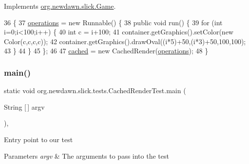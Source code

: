Implements \mbox{\hyperlink{interfaceorg_1_1newdawn_1_1slick_1_1_game_ad2dd6affab08bb8fdb5fab0815957b7a}{org.\+newdawn.\+slick.\+Game}}.


\begin{DoxyCode}
36                                                                           \{
37         \mbox{\hyperlink{classorg_1_1newdawn_1_1slick_1_1tests_1_1_cached_render_test_a2b36bcbc4ab1194e7809b06b2457ca84}{operations}} = \textcolor{keyword}{new} Runnable() \{
38             \textcolor{keyword}{public} \textcolor{keywordtype}{void} run() \{
39                 \textcolor{keywordflow}{for} (\textcolor{keywordtype}{int} i=0;i<100;i++) \{
40                     \textcolor{keywordtype}{int} c = i+100;
41                     container.getGraphics().setColor(\textcolor{keyword}{new} Color(c,c,c,c));
42                     container.getGraphics().drawOval((i*5)+50,(i*3)+50,100,100);
43                 \}
44             \}
45         \};
46         
47         \mbox{\hyperlink{classorg_1_1newdawn_1_1slick_1_1tests_1_1_cached_render_test_a62630e9785f2d264aece45743623722a}{cached}} = \textcolor{keyword}{new} CachedRender(\mbox{\hyperlink{classorg_1_1newdawn_1_1slick_1_1tests_1_1_cached_render_test_a2b36bcbc4ab1194e7809b06b2457ca84}{operations}});
48     \}
\end{DoxyCode}
\mbox{\label{classorg_1_1newdawn_1_1slick_1_1tests_1_1_cached_render_test_a49297378321ea39d8ec3850beaf1266f}} 
\subsubsection{\texorpdfstring{main()}{main()}}
{\footnotesize\ttfamily static void org.\+newdawn.\+slick.\+tests.\+Cached\+Render\+Test.\+main (\begin{DoxyParamCaption}\item[{String \mbox{[}$\,$\mbox{]}}]{argv }\end{DoxyParamCaption})\hspace{0.3cm}{\ttfamily [inline]}, {\ttfamily [static]}}

Entry point to our test


\begin{DoxyParams}{Parameters}
{\em argv} & The arguments to pass into the test \\
\hline
\end{DoxyParams}

